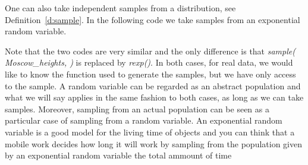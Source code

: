 	One can also take independent samples from a distribution, see Definition~\ref{d:sample}. In the following code we take samples from an exponential random variable.
\begin{knitrout}
\color{fgcolor}\begin{kframe}
\begin{alltt}
 \hlkwb{<-} 
 \hlkwb{<-} 
\end{alltt}
\end{kframe}
\end{knitrout}
Note that the two codes are very similar and the only difference is that \textit{ sample( Moscow\_heights,  )} is replaced by \textit{rexp()}. In both cases, for real data, we would like to know the function used to generate the samples, but we have only access to the sample. 
A random variable can be regarded as an abstract population and what we will say applies in the same fashion to both cases, as long as we can take samples. Moreover, sampling from an actual population can be seen as a particular case of sampling from a random variable.
	An exponential random variable is a good model for the living time of objects and you can think that a mobile work decides how long it will work by sampling from the population given by an exponential random variable the total  ammount of time 
	
